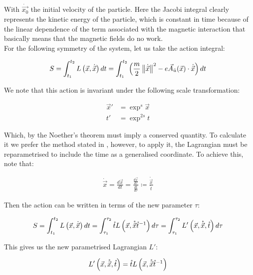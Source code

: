 With $\dot{\vec{x_0}}$ the initial velocity of the particle. Here the Jacobi integral clearly represents the kinetic energy of the particle, which is constant in time because of the linear dependence of the term associated with the magnetic interaction that basically means that the magnetic fields do no work.\\

For the following symmetry of the system, let us take the action integral:

\begin{equation}
S = \int_{t_1}^{t_2}L\left( \vec{x},\dot{\vec{x}} \right)dt = \int_{t_1}^{t_2}\left( \frac{m}{2}\left\lVert \dot{\vec{x}} \right\rVert^2 - e\vec{A}_{\hat{u}}(\vec{x})\cdot\dot{\vec{x}} \right)dt 
\label{eq:action}
\end{equation}

We note that this action is invariant under the following scale transformation:

\begin{align*}
\vec{x}' &= \exp^{s}\vec{x}\\
t'&= \exp^{2s}t
\end{align*}

Which, by the Noether's theorem must imply a conserved quantity. To calculate it we prefer the method stated in \cite[Thm (dontforget)]{scheck}, however, to apply it, the Lagrangian must be reparametrised to include the time as a generalised coordinate. To achieve this, note that:

\begin{align*}
\dot{\vec{x}} = \frac{d\vec{x}}{dt} = \frac{\frac{d\vec{x}}{d\tau}}{\frac{dt}{d\tau}} \coloneqq \frac{\mathring{\vec{x}}}{\mathring{t}}
\end{align*}

Then the action can be written in terms of the new parameter $\tau$:

\begin{equation*}
S = \int_{t_1}^{t_2}L\left( \vec{x},\dot{\vec{x}} \right)dt = \int_{\tau_1}^{\tau_2}\mathring{t}L\left( \vec{x},\mathring{\vec{x}}{\mathring{t}}^{-1} \right)d\tau                                                                    = \int_{\tau_1}^{\tau_2}L'\left( \vec{x},\mathring{\vec{x}},\mathring{t} \right)d\tau
\label{eq:action}
\end{equation*}

This gives us the new parametrised Lagrangian $L'$:

\begin{equation*}
L'\left( \vec{x},\mathring{\vec{x}},\mathring{t} \right) = \mathring{t}L\left( \vec{x},\mathring{\vec{x}}{\mathring{t}}^{-1} \right)
\end{equation*}








